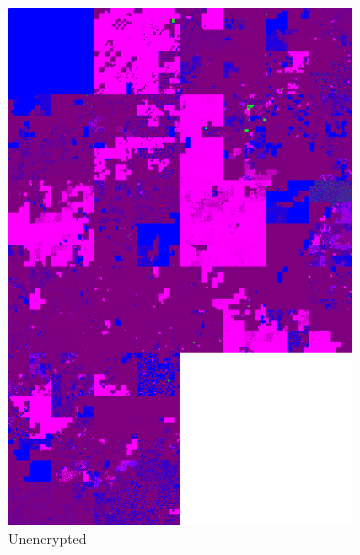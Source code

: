 \documentclass[
  digital, %
  oneside, %
  lof,     %
  lot,     %
]{fithesis4}
\begin{document}
\begin{figure}
    \centering
    \begin{subfigure}[t]{.45\textwidth}
        \centering
        \includegraphics[width=\textwidth,interpolate=false]{figures/ubnt-unencrypted-test-chi2-4-hilbert.png}
        \caption{Unencrypted}
        \label{fig:bad-enc-unenc}
    \end{subfigure}
    \hfill
    \begin{subfigure}[t]{.45\textwidth}
        \centering

\end{subfigure}
\end{figure}
\end{document}
